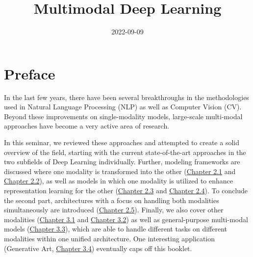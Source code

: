 \documentclass[
]{krantz}
\title{Multimodal Deep Learning}
\author{}
\date{\vspace{-2.5em}2022-09-09}
\begin{document}
\maketitle


\thispagestyle{empty}

\begin{center}
\end{center}

\setlength{\abovedisplayskip}{-5pt}
\setlength{\abovedisplayshortskip}{-5pt}

{
\hypersetup{linkcolor=}
\setcounter{tocdepth}{1}
\tableofcontents
}
\hypertarget{preface}{%
\chapter*{Preface}\label{preface}}


In the last few years, there have been several breakthroughs in the methodologies used in Natural Language Processing (NLP) as well as Computer Vision (CV). Beyond these improvements on single-modality models, large-scale multi-modal approaches have become a very active area of research.

In this seminar, we reviewed these approaches and attempted to create a solid overview of the field, starting with the current state-of-the-art approaches in the two subfields of Deep Learning individually. Further, modeling frameworks are discussed where one modality is transformed into the other (\href{./02-01-img2text.html}{Chapter 2.1} and \href{./02-02-text2img.html}{Chapter 2.2}), as well as models in which one modality is utilized to enhance representation learning for the other (\href{./02-03-img-support-text.html}{Chapter 2.3} and \href{./02-04-text-support-img.html}{Chapter 2.4}). To conclude the second part, architectures with a focus on handling both modalities simultaneously are introduced (\href{./02-05-text-plus-img.html}{Chapter 2.5}). Finally, we also cover other modalities (\href{./03-01-further-modalities.html}{Chapter 3.1} and \href{./03-02-structured-unstructured.html}{Chapter 3.2}) as well as general-purpose multi-modal models (\href{./03-03-multi-purpose.html}{Chapter 3.3}), which are able to handle different tasks on different modalities within one unified architecture. One interesting application (Generative Art, \href{./03-04-usecase.html}{Chapter 3.4}) eventually caps off this booklet.
\end{document}
